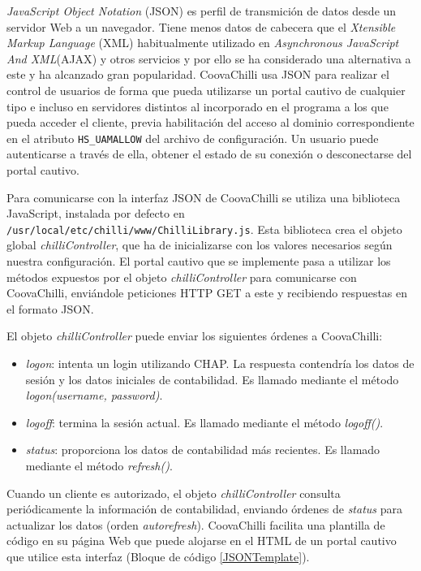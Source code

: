 \emph{JavaScript Object Notation} (JSON) es perfil de transmición de datos desde un servidor Web a un navegador. Tiene menos datos de cabecera que el \emph{Xtensible Markup Language} (\acrshort{XML}) habitualmente utilizado en \emph{Asynchronous JavaScript And XML}(\acrshort{AJAX}) y otros servicios y por ello se ha considerado una alternativa a este y ha alcanzado gran popularidad. CoovaChilli usa JSON para realizar el control de usuarios de forma que pueda utilizarse un portal cautivo de cualquier tipo e incluso en servidores distintos al incorporado en el programa a los que pueda acceder el cliente, previa habilitación del acceso al dominio correspondiente en el atributo \verb+HS_UAMALLOW+ del archivo de configuración. Un usuario puede autenticarse a través de ella, obtener el estado de su conexión o desconectarse del portal cautivo.

Para comunicarse con la interfaz JSON de CoovaChilli se utiliza una biblioteca JavaScript, instalada por defecto en \verb+/usr/local/etc/chilli/www/ChilliLibrary.js+. Esta biblioteca crea el objeto global \emph{chilliController}, que ha de inicializarse con los valores necesarios según nuestra configuración. El portal cautivo que se implemente pasa a utilizar los métodos expuestos por el objeto \emph{chilliController} para comunicarse con CoovaChilli, enviándole peticiones HTTP GET a este y recibiendo respuestas en el formato JSON.

El objeto \emph{chilliController} puede enviar los siguientes órdenes a CoovaChilli:

\begin{itemize}
\item \emph{logon}: intenta un login utilizando CHAP. La respuesta contendría los datos de sesión y los datos iniciales de contabilidad. Es llamado mediante el método \emph{logon(username, password)}.
\item \emph{logoff}: termina la sesión actual. Es llamado mediante el método \emph{logoff()}.
\item \emph{status}: proporciona los datos de contabilidad más recientes. Es llamado mediante el método \emph{refresh()}.
\end{itemize}


Cuando un cliente es autorizado, el objeto \emph{chilliController} consulta periódicamente la información de contabilidad, enviando órdenes de \emph{status} para actualizar los datos (orden \emph{autorefresh}).
CoovaChilli facilita una plantilla de código en su página Web que puede alojarse en el HTML de un portal cautivo que utilice esta interfaz (Bloque de código \ref{JSONTemplate}).

